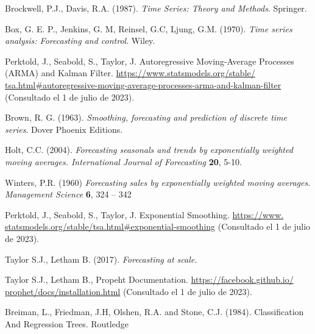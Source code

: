 \documentclass[12pt,twoside]{article}
\begin{document}
\newpage
{}
\begin{thebibliography}{100}

 Brockwell, P.J., Davis, R.A.  (1987).
\textit{Time Series: Theory and Methods}. Springer.



 Box, G. E. P., Jenkins, G. M, Reinsel, G.C, Ljung, G.M.  (1970).
\textit{Time series analysis: Forecasting and control}. Wiley.

 Perktold, J., Seabold, S., Taylor, J. Autoregressive Moving-Average Processes (ARMA) and Kalman Filter. \href{https://www.statsmodels.org/stable/ tsa.html\#autoregressive-moving-average-processes-arma-and-kalman-filter}{https://www.statsmodels.org/stable/ tsa.html\#autoregressive-moving-average-processes-arma-and-kalman-filter} (Consultado el 1 de julio de 2023).



 Brown, R. G. (1963). \textit{Smoothing, forecasting and prediction of
discrete time series}. Dover Phoenix Editions.

 Holt, C.C. (2004). \textit{Forecasting seasonals and trends by exponentially weighted moving averages. International Journal of Forecasting} \textbf{20}, 5-10.

 Winters, P.R. (1960) \textit{Forecasting sales by exponentially weighted
moving averages. Management Science} \textbf{6}, 324 – 342 

 Perktold, J., Seabold, S., Taylor, J. Exponential Smoothing. \href{https://www.statsmodels.org/stable/tsa.html\#exponential-smoothing}{https://www. statsmodels.org/stable/tsa.html\#exponential-smoothing} (Consultado el 1 de julio de 2023).


 Taylor S.J., Letham B. (2017). \textit{Forecasting at scale}.

 Taylor S.J., Letham B., Propeht Documentation. \href{https://facebook.github.io/prophet/docs/installation.html}{https://facebook.github.io/ prophet/docs/installation.html} (Consultado el 1 de julio de 2023).





 Breiman, L., Friedman, J.H, Olshen, R.A. and Stone, C.J. (1984). Classification
And Regression Trees. Routledge


\end{thebibliography}
\end{document}
